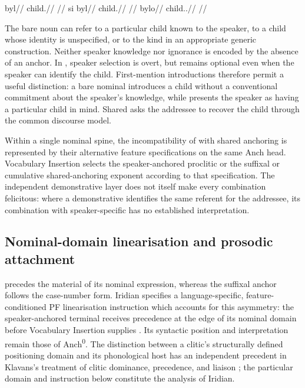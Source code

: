 \pex
\a
\begingl
\gla byl//
\glb child.\Dir{}//
\glft {} //
\endgl
\a
\begingl
\gla si byl//
\glb \Sanch{} child.\Dir{}//
\glft {}//
\endgl
\a
\begingl
\gla bylo//
\glb child.\Dir{}.\Def{}//
\glft {} //
\endgl
\xe

\noindent The bare noun can refer to a particular child known to the speaker,
to a child whose identity is unspecified, or to the kind in an appropriate
generic construction. Neither speaker knowledge nor ignorance is encoded by
the absence of an anchor. In , speaker selection is overt, but
 remains optional even when the speaker can identify the child.
First-mention introductions therefore permit a useful distinction: a bare
nominal introduces a child without a conventional commitment about the
speaker's knowledge, while  presents the speaker as having a
particular child in mind. Shared  asks the addressee to recover the
child through the common discourse model.

Within a single nominal spine, the incompatibility of  with shared
anchoring is represented by their alternative feature specifications on the
same Anch head. Vocabulary Insertion selects the speaker-anchored proclitic or
the suffixal or cumulative shared-anchoring exponent according to that
specification. The independent
demonstrative layer does not itself make every combination felicitous: where
a demonstrative identifies the same referent for the addressee, its
combination with speaker-specific  has no established interpretation.

\subsection{Nominal-domain linearisation and prosodic attachment}
\label{sec:nm-si-linearisation}

 precedes the material of its nominal expression, whereas the
suffixal anchor follows the case-number form. Iridian specifies a language-specific,
feature-conditioned PF linearisation instruction which accounts for this
asymmetry: the speaker-anchored terminal
receives precedence at the edge of its nominal domain before Vocabulary
Insertion supplies . Its syntactic position and interpretation remain
those of Anch\textsuperscript{0}. The distinction between a clitic's
structurally defined positioning domain and its phonological host has an
independent precedent in Klavans's treatment of clitic dominance, precedence,
and liaison \cite[§§\,1.2--1.3]{klavans1985}; the particular domain and
instruction below constitute the analysis of Iridian.

